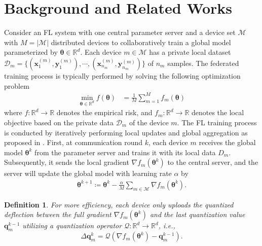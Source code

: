 \documentclass[lettersize,journal]{IEEEtran}
\newtheorem{definition}{Definition}
\begin{document}
\section{Background and Related Works}
Consider an FL system with one central parameter server and a device set $\mathcal{M}$ with $ M=| \mathcal{M} | $ distributed devices to collaboratively train a global model parameterized by $\boldsymbol{\theta}\in \mathbb{R}^{d}$. Each device $m\in\mathcal{M}$ has a private local dataset $\mathcal{D}_{m}=\{(\boldsymbol{x}_{1}^{(m)}, \boldsymbol{y}_{1}^{(m)}), \cdots, (\boldsymbol{x}_{n_m}^{(m)}, \boldsymbol{y}_{n_m}^{(m)})\}$ of $n_m$ samples. The federated training process is typically performed by solving the following optimization problem
\begin{equation}
\begin{aligned}
    \min _{\boldsymbol{\theta}\in \mathbb{R}^{d}} f(\boldsymbol{\theta})&= \frac{1}{M}\sum_{m=1}^{M} f_{m}(\boldsymbol{\theta}) 
    \label{emp_risk}
\end{aligned}
\end{equation}
where $f:\mathbb{R}^{d}\rightarrow\mathbb{R}$ denotes the empirical risk, and $f_{m}:\mathbb{R}^{d}\rightarrow\mathbb{R}$ denotes the local objective based on the private data $\mathcal{D}_m$ of the device $m$.
The FL training process is conducted by iteratively performing local updates and global aggregation as proposed in \cite{mcmahan2017communication}. First, at communication round $k$, each device $m$ receives the global model $\boldsymbol{\theta}^{k}$ from the parameter server and trains it with its local data $D_m$. 
Subsequently, it sends the local gradient $\nabla f_{m}(\boldsymbol{\theta}^{k})$ to the central server, and the server will update the global model with learning rate $\alpha$ by
\begin{align}
\boldsymbol{\theta} ^{k+1} \coloneqq \boldsymbol{\theta} ^{k} - \frac{\alpha}{M}\sum_{m \in \mathcal{M}}\nabla f_{m}(\boldsymbol{\theta}^{k}).
\label{ori_update}
\end{align} 
\begin{definition}
\label{def1}
\textit{For more efficiency, each device only uploads the quantized deflection between the full gradient $\nabla f_m(\boldsymbol{\theta}^{k})$ and the last quantization value $\boldsymbol{q}_{m}^{k-1}$ utilizing a quantization operator $\mathcal{Q}: \mathbb{R}^d \rightarrow \mathbb{R}^d$, i.e.,}
\begin{equation}
    \Delta \boldsymbol{q}_{m}^{k} = \mathcal{Q}(\nabla f_m(\boldsymbol{\theta}^{k})-\boldsymbol{q}_{m}^{k-1}).
\end{equation}
\end{definition} 
\end{document}
